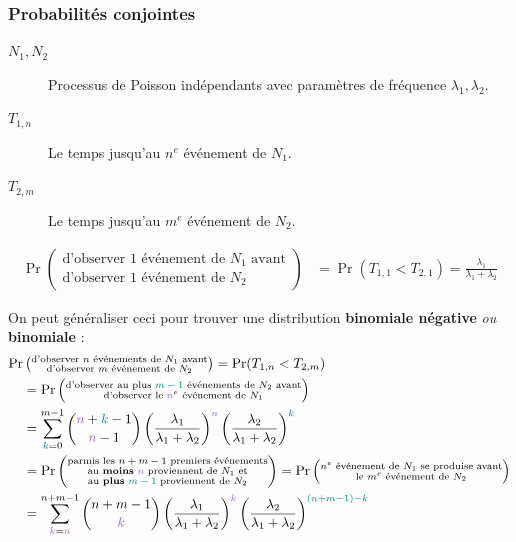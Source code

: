 \documentclass[10pt, french]{article}
\begin{document}
\begin{multicols*}{2}
\columnbreak
\subsubsection{Probabilités conjointes}
\begin{distributions}[Notation]
\begin{description}
	\item[$N_{1}, N_{2}$]	Processus de Poisson indépendants avec paramètres de fréquence $\lambda_{1}, \lambda_{2}$.
	\item[$T_{1, n}$]	Le temps jusqu'au $n^{e}$ événement de $N_{1}$.
	\item[$T_{2, m}$]	Le temps jusqu'au $m^{e}$ événement de $N_{2}$.
\end{description}
\end{distributions}

\begin{align*}
	\Pr\left(\substack{\text{d'observer 1 événement de $N_{1}$ avant}\\ \text{d'observer 1 événement de $N_{2}$}}\right)
	&=	\Pr(T_{1, 1}	 < T_{2, 1})
	=	\frac{\lambda_{1}}{\lambda_{1} + \lambda_{2}}
\end{align*}

On peut généraliser ceci pour trouver une distribution \textbf{binomiale négative} \textit{ou} \textbf{binomiale} :	\\
\begin{align*}
	\Pr&\left(\substack{
			\text{d'observer $n$ événements de $N_{1}$ avant}\\ 
			\text{d'observer $m$ événement de $N_{2}$}}
		\right)
	=	\Pr(T_{1, n}	 < T_{2, m})	\\
	&=	\Pr\left(\substack{
			\text{d'observer au plus $\textcolor{teal}{m - 1}$ événements de $N_{2}$ avant}\\
			\text{d'observer le $\textcolor{amethyst}{n}^{e}$ événement de $N_{1}$}}
		\right)	\\
	&=	\sum_{\textcolor{teal}{k} = 0}^{m - 1}
			\binom{\textcolor{amethyst}{n} + \textcolor{teal}{k} - 1}{\textcolor{amethyst}{n} - 1}
			\left(\frac{\lambda_{1}}{\lambda_{1} + \lambda_{2}}\right)^{\textcolor{amethyst}{n}}
			\left(\frac{\lambda_{2}}{\lambda_{1} + \lambda_{2}}\right)^{\textcolor{teal}{k}}	\\
	&=	\Pr\left(\substack{
			\text{parmis les $n + m - 1$ premiers événements}\\ 
			\text{au \textbf{moins} $\textcolor{amethyst}{n}$ proviennent de $N_{1}$ et}\\ 
			\text{au \textbf{plus} $\textcolor{teal}{m - 1}$ proviennent de $N_{2}$}}
		\right)	
	=	\Pr\left(\substack{
			\text{$n^{e}$ événement de $N_{1}$ se produise avant}\\ 
			\text{le $m^{e}$ événement de $N_{2}$}}
		\right)	\\
	&=	\sum_{\textcolor{amethyst}{k} = \textcolor{amethyst}{n}}^{n + m - 1}
			\binom{n + m - 1}{\textcolor{amethyst}{k}} 
			\left(\frac{\lambda_{1}}{\lambda_{1} + \lambda_{2}}\right)^{\textcolor{amethyst}{k}} 
			\left(\frac{\lambda_{2}}{\lambda_{1} + \lambda_{2}}\right)^{\textcolor{teal}{(n + m - 1) - k}}	\\
\end{align*}


\end{multicols*}
\end{document}
